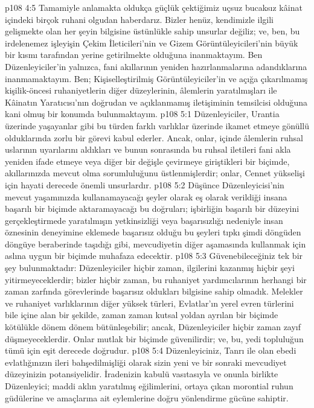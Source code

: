 \vs p108 4:5 Tamamiyle anlamakta oldukça güçlük çektiğimiz uçsuz bucaksız kâinat içindeki birçok ruhani olgudan haberdarız. Bizler henüz, kendimizle ilgili gelişmekte olan her şeyin bilgisine üstünlükle sahip unsurlar değiliz; ve, ben, bu irdelenemez işleyişin Çekim İleticileri’nin ve Gizem Görüntüleyicileri’nin büyük bir kısmı tarafından yerine getirilmekte olduğuna inanmaktayım. Ben Düzenleyiciler’in yalnızca, fani akıllarının yeniden hazırlanmalarına adandıklarına inanmamaktayım. Ben; Kişiselleştirilmiş Görüntüleyiciler’in ve açığa çıkarılmamış kişilik\hyp{}öncesi ruhaniyetlerin diğer düzeylerinin, âlemlerin yaratılmışları ile Kâinatın Yaratıcısı’nın doğrudan ve açıklanmamış iletişiminin temsilcisi olduğuna kani olmuş bir konumda bulunmaktayım.
\vs p108 5:1 Düzenleyiciler, Urantia üzerinde yaşayanlar gibi bu türden farklı varlıklar üzerinde ikamet etmeye gönüllü olduklarında zorlu bir görevi kabul ederler. Ancak, onlar, içinde âlemlerin ruhsal uslarının uyarılarını aldıkları ve bunun sonrasında bu ruhsal iletileri fani akla yeniden ifade etmeye veya diğer bir değişle çevirmeye giriştikleri bir biçimde, akıllarınızda mevcut olma sorumluluğunu üstlenmişlerdir; onlar, Cennet yükselişi için hayati derecede önemli unsurlardır.
\vs p108 5:2 Düşünce Düzenleyicisi’nin mevcut yaşamınızda kullanamayacağı şeyler olarak eş olarak verildiği insana başarılı bir biçimde aktaramayacağı bu doğruları; işbirliğin başarılı bir düzeyini gerçekleştirmede yaratılmışın yetkinsizliği veya başarısızlığı nedeniyle insan öznesinin deneyimine eklemede başarısız olduğu bu şeyleri tıpkı şimdi döngüden döngüye beraberinde taşıdığı gibi, mevcudiyetin diğer aşamasında kullanmak için aslına uygun bir biçimde muhafaza edecektir.
\vs p108 5:3 Güvenebileceğiniz tek bir şey bulunmaktadır: Düzenleyiciler hiçbir zaman, ilgilerini kazanmış hiçbir şeyi yitirmeyeceklerdir; bizler hiçbir zaman, bu ruhaniyet yardımcılarının herhangi bir zaman zarfında görevlerinde başarısız oldukları bilgisine sahip olmadık. Melekler ve ruhaniyet varlıklarının diğer yüksek türleri, Evlatlar’ın yerel evren türlerini bile içine alan bir şekilde, zaman zaman kutsal yoldan ayrılan bir biçimde kötülükle dönem dönem bütünleşebilir; ancak, Düzenleyiciler hiçbir zaman zayıf düşmeyeceklerdir. Onlar mutlak bir biçimde güvenilirdir; ve, bu, yedi topluluğun tümü için eşit derecede doğrudur.
\vs p108 5:4 Düzenleyiciniz, Tanrı ile olan ebedi evlatlığınızın ileri bahşedilmişliği olarak sizin yeni ve bir sonraki mevcudiyet düzeyinizin potansiyelidir. İradenizin kabulü vasıtasıyla ve onunla birlikte Düzenleyici; maddi aklın yaratılmış eğilimlerini, ortaya çıkan morontial ruhun güdülerine ve amaçlarına ait eylemlerine doğru yönlendirme gücüne sahiptir.
